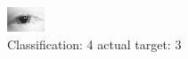 \begin{figure}[h!]
\begin{center}
\includegraphics[width=0.60\columnwidth]{figures/ID85_class_4_target_3.png}
\end{center}
\caption{ Classification: 4 actual target: 3}
\label{fig:ID85_class_4_target_3}
\end{figure}
